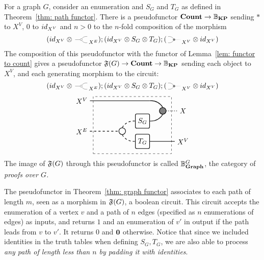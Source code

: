 \documentclass[preliminary,copyright,creativecommons,sharealike,noncommercial]{eptcs}
\begin{document}
\begin{theorem}\label{thm: graph functor}
  For a graph $G$, consider an enumeration and $S_G$ and $T_G$ 
  as defined in Theorem~\ref{thm: path functor}. There is a pseudofunctor 
  $\textbf{Count} \to \mathbb{B}_\textbf{KP}$ sending $*$ to $X^V$, $0$ to $id_{X^V}$ 
  and $n > 0$ to the $n$-fold composition of the morphism
  \begin{equation*}
      (\Id{X^V} \Tensor \COPYSym_{X^E});
      (\Id{X^V} \Tensor S_G \Tensor T_G);(\MATCHSym_{X^V} \Tensor \Id{X^V})
  \end{equation*}
  The composition of this pseudofunctor with the functor of 
  Lemma~\ref{lem: functor to count} gives a pseudofunctor 
  $\mathfrak{F}(G) \to \textbf{Count} \to \mathbb{B}_\textbf{KP}$ sending each object to $X^V$, and each 
  generating morphism to the circuit:
  \begin{equation*}
    (\Id{X^V} \Tensor \COPYSym_{X^E});
      (\Id{X^V} \Tensor S_G \Tensor T_G);(\MATCHSym_{X^V} \Tensor \Id{X^V})
  \end{equation*}
  \begin{equation*}
    \begin{tikzpicture}
      \node[draw, circle, radius=5pt, thick] (copy) at (-1,0.5) {};
      \node[draw, minimum height=20, minimum width=20, rounded corners=2, thick] (S) at (0,1) {$S_G$};
      \node[draw, minimum height=20, minimum width=20, rounded corners=2, thick] (T) at (0,0) {$T_G$};
      \node[draw, fill=gray, circle, radius=5pt, thick] (mat) at (1,1.5) {};

      \node[draw, dashed, minimum height=80, minimum width=110] (contour) at (-0.5,0.8) {};

      \node (Xv) at (-3,2) {$X^V$};
      \node (Xe) at (-3,0.5) {$X^E$};
      \node (X) at (2,1.5) {$X$};
      \node (Xv2) at (2,0) {$X^V$};

      \draw[-, thick] (Xv) to (10pt,2);
      \draw[bend left, thick] (10pt,2) to (mat.north);
      \draw[bend right, thick] (S.east) to (mat.south);

      \draw[dashed, -, thick] (Xe) to (copy.west);

      \draw[dashed, bend left, thick] (copy.north) to (S.west);
      \draw[dashed, bend right, thick] (copy.south) to (T.west);

      \draw[-, dotted, thick] (mat.east) -- (X);
      \draw[-, thick] (T.east) -- (Xv2.west);
    \end{tikzpicture}
  \end{equation*}
  The image of $\mathfrak{F}(G)$ through this pseudofunctor 
  is called $\mathbb{B}^{G}_{\textbf{Graph}}$, the category of \emph{proofs over $G$.}
\end{theorem}
%
The pseudofunctor in Theorem~\ref{thm: graph functor} 
associates to each path of length $m$, seen as a morphism 
in $\mathfrak{F}(G)$, a boolean circuit. 
This circuit accepts the enumeration of a vertex $v$ 
and a path of $n$ edges (specified as $n$ enumerations 
of edges) as inputs, and returns $1$ and an enumeration of $v'$
in output if the path leads from $v$ to $v'$. It returns $0$ and 
$\textbf{0}$ otherwise. Notice that since we included identities 
in the truth tables when defining $S_G, T_G$, we are also 
able to process \emph{any path of length less than $n$ by 
padding it with identities}.
%
%
%
\end{document}

